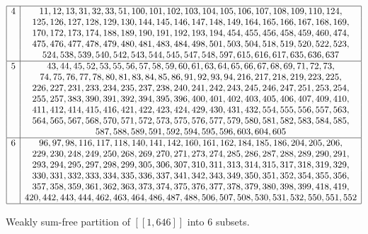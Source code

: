 \documentclass[final,onefignum,onetabnum]{siamart190516}
\begin{document}
\begin{table}[H]
\begin{small}
\[\begin{array}{|*{2}{c|}}
		\hline
		4 & 11, 12, 13, 31, 32, 33, 51, 100, 101, 102, 103, 104, 105, 106, 107, 108, 109, 110, 124, \\
		& 125, 126, 127, 128, 129, 130, 144, 145, 146, 147, 148, 149, 164, 165, 166, 167, 168, 169, \\
		& 170, 172, 173, 174, 188, 189, 190, 191, 192, 193, 194, 454, 455, 456, 458, 459, 460, 474, \\
		& 475, 476, 477, 478, 479, 480, 481, 483, 484, 498, 501, 503, 504, 518, 519, 520, 522, 523, \\
		& 524, 538, 539, 540, 542, 543, 544, 545, 547, 548, 597, 615, 616, 617, 635, 636, 637 \\
		\hline
		5 & 43, 44, 45, 52, 53, 55, 56, 57, 58, 59, 60, 61, 63, 64, 65, 66, 67, 68, 69, 71, 72, 73, \\
		& 74, 75, 76, 77, 78, 80, 81, 83, 84, 85, 86, 91, 92, 93, 94, 216, 217, 218, 219, 223, 225, \\
		& 226, 227, 231, 233, 234, 235, 237, 238, 240, 241, 242, 243, 245, 246, 247, 251, 253, 254, \\
		& 255, 257, 383, 390, 391, 392, 394, 395, 396, 400, 401, 402, 403, 405, 406, 407, 409, 410, \\
		& 411, 412, 414, 415, 416, 421, 422, 423, 424, 429, 430, 431, 432, 554, 555, 556, 557, 563, \\ 
		& 564, 565, 567, 568, 570, 571, 572, 573, 575, 576, 577, 579, 580, 581, 582, 583, 584, 585, \\
		& 587, 588, 589, 591, 592, 594, 595, 596, 603, 604, 605 \\
		\hline
		6 & 96, 97, 98, 116, 117, 118, 140, 141, 142, 160, 161, 162, 184, 185, 186, 204, 205, 206, \\
		& 229, 230, 248, 249, 250, 268, 269, 270, 271, 273, 274, 285, 286, 287, 288, 289, 290, 291, \\
		& 293, 294, 295, 297, 298, 299, 305, 306, 307, 310, 311, 313, 314, 315, 317, 318, 319, 329, \\
		& 330, 331, 332, 333, 334, 335, 336, 337, 341, 342, 343, 349, 350, 351, 352, 354, 355, 356, \\
		& 357, 358, 359, 361, 362, 363, 373, 374, 375, 376, 377, 378, 379, 380, 398, 399, 418, 419, \\
		& 420, 442, 443, 444, 462, 463, 464, 486, 487, 488, 506, 507, 508, 530, 531, 532, 550, 551, 552 \\
		\hline
	\end{array}
	\]
\end{small}
\vspace{-3ex}
\caption{Weakly sum-free partition of \([\![ 1, 646 ]\!] \) into 6 subsets.}
\vspace{-2ex}
\end{table}
\end{document}
